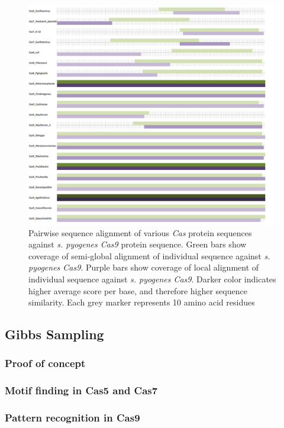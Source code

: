 \documentclass[11pt, oneside]{article}
\begin{document}
\begin{figure}[ht]
  \centering
  \includegraphics[scale = 0.45]{images/dp_figure2}
      \caption{Pairwise sequence alignment of various \textit{Cas} protein sequences against \textit{s. pyogenes Cas9} protein sequence. Green bars show coverage of semi-global alignment of individual sequence against \textit{s. pyogenes Cas9}. Purple bars show coverage of local alignment of individual sequence against \textit{s. pyogenes Cas9}. Darker color indicates higher average score per base, and therefore higher sequence similarity. Each grey marker represents 10 amino acid residues}
      \label{dp2}
\end{figure}

\subsection{Gibbs Sampling}

\subsubsection{Proof of concept}

\subsubsection{Motif finding in Cas5 and Cas7}

\subsubsection{Pattern recognition in Cas9}
\end{document}
